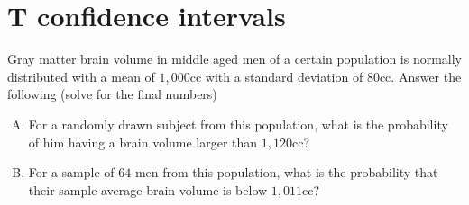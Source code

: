 \documentclass[12pt]{article}
\begin{document}
\section{T confidence intervals}
\item Gray matter brain volume in middle aged men of a certain
  population is normally distributed with a mean of $1,000$cc with a
  standard deviation of $80$cc. Answer the following (solve for the
  final numbers)
\begin{enumerate}[A.]
\item For a randomly drawn subject from this population, what is the
  probability of him having a brain volume larger than $1,120$cc?
\item For a sample of $64$ men from this population, what is the
  probability that their sample average brain volume is below
  $1,011$cc?
\end{enumerate}
\end{document}
